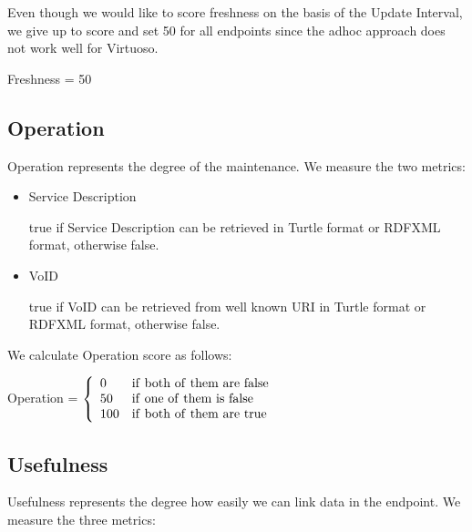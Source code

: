 \documentclass[11pt,a4paper]{article}
\begin{document}
Even though we would like to score freshness on the basis of the Update Interval,
we give up to score and set 50 for all endpoints since the adhoc approach does not work well for Virtuoso.

\begin{mdframed}
  \center
Freshness = 50
\end{mdframed}

\subsection{Operation}

Operation represents the degree of the maintenance.
We measure the two metrics:

\begin{itemize}

  \item Service Description

  true if Service Description can be retrieved in Turtle format or RDFXML format, otherwise false.

  \item VoID

  true if VoID can be retrieved from well known URI\cite{Alexandar:11:VoID} in Turtle format or RDFXML format, otherwise false.

\end{itemize}

We calculate Operation score as follows:

\begin{mdframed}
\center
Operation = $\left\{
    \begin{array}{ll}
      0   & {\rm if~both~of~them~are~false } \\
      50  & {\rm if~one~of~them~is~false } \\
      100 & {\rm if~both~of~them~are~true }
  \end{array}
  \right.$
\end{mdframed}

\subsection{Usefulness}

Usefulness represents the degree how easily we can link data in the endpoint.
We measure the three metrics:
\end{document}
